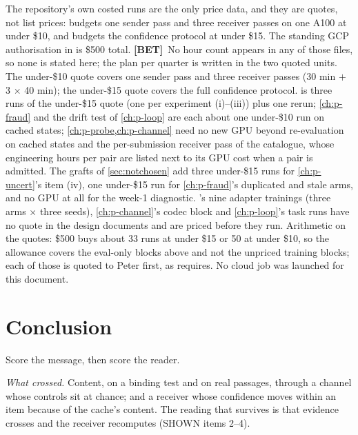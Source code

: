 \documentclass[11pt,a4paper]{report}
\newcommand{\BET}{\textcolor{betc}{\textbf{\scriptsize[BET]}}}
\begin{document}
The repository's own costed runs are the only price data, and they are quotes, not list prices:  budgets one sender pass and three receiver passes on one A100 at under \$10, and  budgets the confidence protocol at under \$15. The standing GCP authorisation in  is \$500 total. \BET\ No hour count appears in any of those files, so none is stated here; the plan per quarter is written in the two quoted units. The under-\$10 quote covers one sender pass and three receiver passes (30 min $+$ 3 $\times$ 40 min); the under-\$15 quote covers the full confidence protocol.  is three runs of the under-\$15 quote (one per experiment (i)--(iii)) plus one rerun; \cref{ch:p-fraud} and the drift test of \cref{ch:p-loop} are each about one under-\$10 run on cached states; \cref{ch:p-probe,ch:p-channel} need no new GPU beyond re-evaluation on cached states and the per-submission receiver pass of the catalogue, whose engineering hours per pair are listed next to its GPU cost when a pair is admitted. The grafts of \cref{sec:notchosen} add three under-\$15 runs for \cref{ch:p-uncert}'s item (iv), one under-\$15 run for \cref{ch:p-fraud}'s duplicated and stale arms, and no GPU at all for the week-1 diagnostic. 's nine adapter trainings (three arms $\times$ three seeds), \cref{ch:p-channel}'s codec block and \cref{ch:p-loop}'s task runs have no quote in the design documents and are priced before they run. Arithmetic on the quotes: \$500 buys about 33 runs at under \$15 or 50 at under \$10, so the allowance covers the eval-only blocks above and not the unpriced training blocks; each of those is quoted to Peter first, as  requires. No cloud job was launched for this document.

\chapter{Conclusion}
\label{ch:conclusion}

Score the message, then score the reader.

\emph{What crossed.} Content, on a binding test and on real passages, through a channel whose controls sit at chance; and a receiver whose confidence moves within an item because of the cache's content. The reading that survives is that evidence crosses and the receiver recomputes (SHOWN items 2--4).
\end{document}
